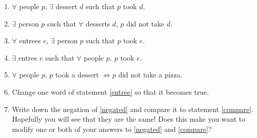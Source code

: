 \begin{enumerate}
\begin{enumerate}
\item \label{negated}$\forall$ people $p$, $\exists$ dessert $d$ such that $ p$
took $d$. 
\item \label{compare}$\exists$ person $p$ such that $\forall$ desserts
$d$, $p$ did not take $d$. 
\item $\forall$ entrees $e$, $\exists$ person $p$ such that $ p$ took
$e$. 
\item \label{entree}$\exists$ entree $e$ such that  $\forall$ people
$p,\ p$ took $e$. 
\item $\forall$ people $p$, $p$ took a dessert $\iff p$ did not take
a pizza. 
\item Change one word of statement \ref{entree} so that it becomes true. 
\item Write down the negation of \ref{negated} and compare it to statement
\ref{compare}. Hopefully you will see that they are the same! Does
this make you want to modify one or both of your answers to \ref{negated}
and \ref{compare}? 
\end{enumerate}

\end{enumerate}
